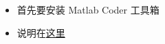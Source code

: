 
\begin{itemize}
\item 首先要安装 Matlab Coder 工具箱
\item 说明在\href{https://ch.mathworks.com/help/coder/index.html?s_tid=CRUX_lftnav}{这里}
\end{itemize}

